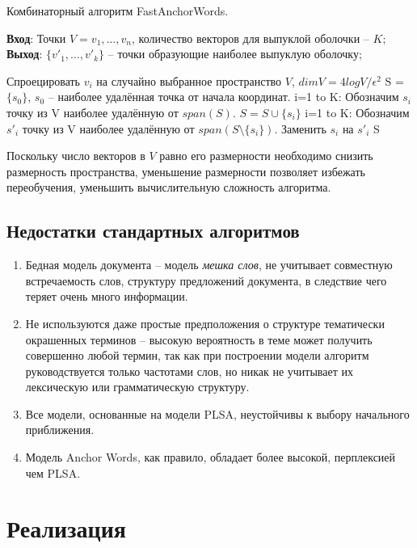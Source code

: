 \documentclass[a4paper, 14pt]{extarticle}
\begin{document}
   		\begin{algorithm}
   		\caption{Комбинаторный алгоритм FastAnchorWords.}
   		\label{plsa}
   			\textbf{Вход}: Точки $V = {v_1, \dots, v_n}$, количество векторов для выпуклой оболочки -- $K$;\\
   			\textbf{Выход}: $\{v'_{1}, \dots, v'_{k}\}$ -- точки образующие наиболее выпуклую оболочку; 
   		\begin{algorithmic}[1]
   				\State Спроецировать $v_i$ на случайно выбранное пространство $V$,  $dim V = 4log V / \epsilon^2$
   				\State S = $\{s_0\}$, $s_0$ -- наиболее удалённая точка от начала координат.
   				\ForAll i=1 to K:
   				\State Обозначим $s_i$ точку из V наиболее удалённую от $span(S)$.
   				\State $S = S \cup \{s_i\}$
   				\EndFor
				\ForAll i=1 to K:
				\State Обозначим $s'_i$ точку из V наиболее удалённую от $span(S\setminus\{s_i\})$.
				\State Заменить $s_i$ на $s'_i$
				\EndFor
				\Return  S
   		\end{algorithmic}
   		\end{algorithm}
   	
Поскольку число векторов в $V$ равно его размерности необходимо снизить размерность пространства, уменьшение размерности позволяет избежать переобучения, уменьшить вычислительную сложность алгоритма.


\subsection{Недостатки стандартных алгоритмов}
\begin{enumerate}
\item Бедная модель документа -- модель \emph{мешка слов}, не учитывает совместную встречаемость слов, структуру предложений документа, в следствие чего теряет очень много информации.
\item Не используются даже простые предположения о структуре тематически окрашенных терминов -- высокую вероятность в теме может получить совершенно любой термин, так как при построении модели алгоритм руководствуется только частотами слов, но никак не учитывает их лексическую или грамматическую структуру.
\item Все модели, основанные на модели PLSA, неустойчивы к выбору начального приближения.
\item Модель Anchor Words, как правило, обладает более высокой, перплексией чем PLSA.
\end{enumerate}

\newpage
\section{Реализация}
\end{document}
